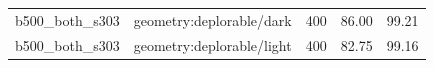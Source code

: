 \begin{longtable}{l>{\raggedright\arraybackslash}p{.42\linewidth}rrr}
b500\_\allowbreak{}both\_\allowbreak{}s303 & %
geometry:deplorable/dark & %
400 & %
86.00 & %
99.21 \\ %

b500\_\allowbreak{}both\_\allowbreak{}s303 & %
geometry:deplorable/light & %
400 & %
82.75 & %
99.16 \\ %


\end{longtable}
